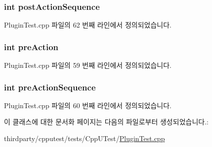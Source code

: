 \subsubsection[{\texorpdfstring{post\+Action\+Sequence}{postActionSequence}}]{\setlength{\rightskip}{0pt plus 5cm}int post\+Action\+Sequence}\hypertarget{class_dummy_plugin_ae65ed7b62f2878ff557cdb3ff611353d}{}\label{class_dummy_plugin_ae65ed7b62f2878ff557cdb3ff611353d}


Plugin\+Test.\+cpp 파일의 62 번째 라인에서 정의되었습니다.

\subsubsection[{\texorpdfstring{pre\+Action}{preAction}}]{\setlength{\rightskip}{0pt plus 5cm}int pre\+Action}\hypertarget{class_dummy_plugin_a7bf91d30e9ac801d5c2ea8867e45f552}{}\label{class_dummy_plugin_a7bf91d30e9ac801d5c2ea8867e45f552}


Plugin\+Test.\+cpp 파일의 59 번째 라인에서 정의되었습니다.

\subsubsection[{\texorpdfstring{pre\+Action\+Sequence}{preActionSequence}}]{\setlength{\rightskip}{0pt plus 5cm}int pre\+Action\+Sequence}\hypertarget{class_dummy_plugin_a187389c828523313bf4cfe7400f445fb}{}\label{class_dummy_plugin_a187389c828523313bf4cfe7400f445fb}


Plugin\+Test.\+cpp 파일의 60 번째 라인에서 정의되었습니다.



이 클래스에 대한 문서화 페이지는 다음의 파일로부터 생성되었습니다.\+:\begin{DoxyCompactItemize}
\item 
thirdparty/cpputest/tests/\+Cpp\+U\+Test/\hyperlink{_plugin_test_8cpp}{Plugin\+Test.\+cpp}\end{DoxyCompactItemize}
